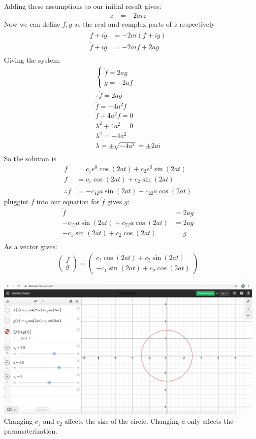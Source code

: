 \documentclass[10pt]{article}
\begin{document}
Adding these assumptions to our initial result gives:
\begin{align*}
\dot z&=-2aiz
\end{align*}
Now we can define $f,g$ as the real and complex parts of $z$ respectively
\begin{align*}
\dot f+i\dot g&=-2ai(f+ig)\\
\dot f+i\dot g&=-2aif+2ag\\
\end{align*}
Giving the system:
\begin{align*}
\begin{cases}\dot f=2ag\\\dot g=-2af\end{cases}\\
\therefore \ddot f=2a\dot g\\
\ddot f=-4a^2f\\
\ddot f+4a^2f=0\\
\lambda^2+4a^2=0\\
\lambda^2=-4a^2\\
\lambda = \pm\sqrt{-4a^2} = \pm2ai\\
\end{align*}
So the solution is
\begin{align*}
f&=c_1e^0\cos(2at)+c_2e^0\sin(2at)\\
f&=c_1\cos(2at)+c_2\sin(2at)\\
\therefore \dot f&=-c_12a\sin(2at)+c_22a\cos(2at)
\end{align*}
pluggint $f$ into our equation for $\dot f$ gives $g$: 
\begin{align*}
\dot f&=2ag\\
-c_12a\sin(2at)+c_22a\cos(2at)&=2ag\\
-c_1\sin(2at)+c_2\cos(2at)&=g\\
\end{align*}
As a vector gives:
\begin{align*}
\begin{pmatrix}f\\g\end{pmatrix}=
\begin{pmatrix}c_1\cos(2at)+c_2\sin(2at)\\-c_1\sin(2at)+c_2\cos(2at)\end{pmatrix}
\end{align*}

\includegraphics[width=\textwidth]{Figure1}
Changing $c_1$ and $c_2$ affects the size of the circle.
Changing $a$ only affects the paramaterization.
\end{document}

